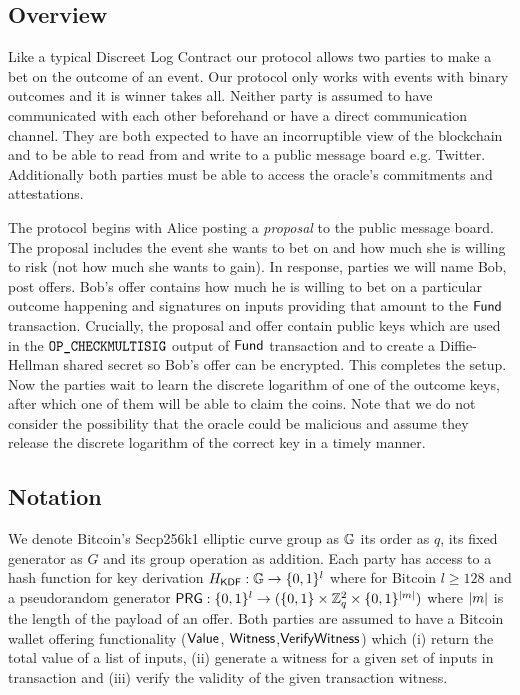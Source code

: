 \documentclass[runningheads]{llncs}
\begin{document}
\subsection{Overview}

Like a typical Discreet Log Contract our protocol allows two parties to make a bet on the outcome of an event. Our protocol only works with events with binary outcomes and it is winner takes all. Neither party is assumed to have communicated with each other beforehand or have a direct communication channel. They are both expected to have an incorruptible view of the blockchain and to be able to read from and write to a public message board e.g. Twitter. Additionally both parties must be able to access the oracle's commitments and attestations.

The protocol begins with Alice posting a \emph{proposal} to the public message board. The proposal includes the event she wants to bet on and how much she is willing to risk (not how much she wants to gain). In response, parties we will name Bob, post offers. Bob's offer contains how much he is willing to bet on a particular outcome happening and signatures on inputs providing that amount to the $\textsf{Fund}$ transaction. Crucially, the proposal and offer contain public keys which are used in the $\texttt{OP\_CHECKMULTISIG}$ output of $\textsf{Fund}$ transaction and to create a Diffie-Hellman shared secret so Bob's offer can be encrypted. This completes the setup. Now the parties wait to learn the discrete logarithm of one of the outcome keys, after which one of them will be able to claim the coins. Note that we do not consider the possibility that the oracle could be malicious and assume they release the discrete logarithm of the correct key in a timely manner.

\subsection{Notation}

We denote Bitcoin's Secp256k1 elliptic curve group as $\mathbb{G}$ its order as $q$, its fixed generator as $G$ and its group operation as addition. Each party has access to a hash function for key derivation $H_{\textsf{KDF}}:\mathbb{G}\to\{0,1\}^{l}$ where for Bitcoin $l \geq 128$ and a pseudorandom generator $\textsf{PRG}:\{0,1\}^l\to(\{0,1\} \times \mathbb{Z}_q^2 \times \{0,1\}^{\left\lvert m \right\rvert})$ where $\left\lvert m \right\rvert$ is the length of the payload of an offer. Both parties are assumed to have a Bitcoin wallet offering functionality ($\textsf{Value}$, $\textsf{Witness}$,$\textsf{VerifyWitness}$) which (i) return the total value of a list of inputs, (ii) generate a witness for a given set of inputs in transaction and (iii) verify the validity of the given transaction witness.
\end{document}
